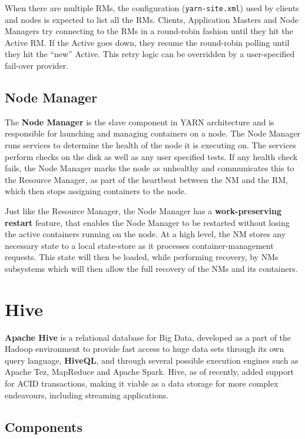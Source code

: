When there are multiple RMs, the configuration (\texttt{yarn-site.xml}) used by clients and nodes is expected to list all the RMs. Clients, Application Masters and Node Managers try connecting to the RMs in a round-robin fashion until they hit the Active RM. If the Active goes down, they resume the round-robin polling until they hit the “new” Active. This retry logic can be overridden by a user-specified fail-over provider.

\subsection{Node Manager}

The \textbf{Node Manager} is the slave component in YARN architecture and is responsible for launching and managing containers on a node. The Node Manager runs services to determine the health of the node it is executing on. The services perform checks on the disk as well as any user specified tests. If any health check fails, the Node Manager marks the node as unhealthy and communicates this to the Resource Manager, as part of the heartbeat between the NM and the RM, which then stops assigning containers to the node.

Just like the Resource Manager, the Node Manager has a \textbf{work-preserving restart} feature, that enables the Node Manager to be restarted without losing the active containers running on the node. At a high level, the NM stores any necessary state to a local state-store as it processes container-management requests. This state will then be loaded, while performing recovery, by NMs subsystems which will then allow the full recovery of the NMs and its containers.

\pagebreak
\section{Hive}

\textbf{Apache Hive} \cite{hive_doc} is a relational database for Big Data, developed as a part of the Hadoop environment to provide fast access to huge data sets through its own query language, \textbf{HiveQL}, and through several possible execution engines such as Apache Tez, MapReduce and Apache Spark. Hive, as of recently, added  support for ACID transactions, making it viable as a data storage for more complex endeavours, including streaming applications.

\subsection{Components}

